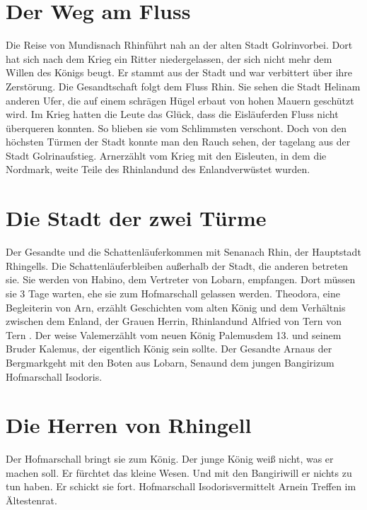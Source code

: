 \documentclass[12pt,a4paper,onecolumn,twoside,ngerman]{book}
\newcommand{\Tern}{Tern }
\newcommand{\Sena}{Sena}
\newcommand{\Bangiri}{Bangiri}
\newcommand{\Arwed}{Alfried von \Tern}
\newcommand{\Enland}{Enland}
\newcommand{\Schattenlaufer}{Schattenläufer}
\newcommand{\Lobarn}{Lobarn}
\newcommand{\Nordmark}{Nordmark}
\newcommand{\Bergmark}{Bergmark}
\newcommand{\Arn}{Arn}
\newcommand{\Eislaufer}{Eisläufer}
\newcommand{\Theodora}{Theodora}
\newcommand{\Rhinland}{Rhinland}
\newcommand{\Rhingell}{Rhingell}
\newcommand{\Mundis}{Mundis}
\newcommand{\Helin}{Helin}
\newcommand{\Golrin}{Golrin}
\newcommand{\Rhin}{Rhin}
\newcommand{\Habino}{Habino}
\newcommand{\Valem}{Valem}
\newcommand{\Palemus}{Palemus}
\newcommand{\Kalemus}{Kalemus}
\newcommand{\Isodoris}{Isodoris}
\begin{document}
\section{Der Weg am Fluss}
Die Reise von \Mundis nach \Rhin führt nah an der alten Stadt \Golrin vorbei. Dort hat sich nach dem Krieg ein Ritter niedergelassen, der sich nicht mehr dem Willen des Königs beugt. Er stammt aus der Stadt und war verbittert über ihre Zerstörung. Die Gesandtschaft folgt dem Fluss \Rhin . Sie sehen die Stadt \Helin am anderen Ufer, die auf einem schrägen Hügel erbaut von hohen Mauern geschützt wird. Im Krieg hatten die Leute das Glück, dass die \Eislaufer den Fluss nicht überqueren konnten. So blieben sie vom Schlimmsten verschont. Doch von den höchsten Türmen der Stadt konnte man den Rauch sehen, der tagelang aus der Stadt \Golrin aufstieg. \Arn erzählt vom Krieg mit den Eisleuten, in dem die \Nordmark , weite Teile des \Rhinland und des \Enland verwüstet wurden. 

\section{Die Stadt der zwei Türme}
Der Gesandte und die \Schattenlaufer kommen mit \Sena nach \Rhin, der Hauptstadt \Rhingell{s}. Die \Schattenlaufer bleiben außerhalb der Stadt, die anderen betreten sie. Sie werden von \Habino , dem Vertreter von \Lobarn , empfangen. Dort müssen sie 3 Tage warten, ehe sie zum Hofmarschall gelassen werden. \Theodora , eine Begleiterin von \Arn , erzählt Geschichten vom alten König und dem Verhältnis zwischen dem \Enland , der Grauen Herrin, \Rhinland und \Arwed von \Tern. Der weise \Valem erzählt vom neuen König \Palemus dem 13. und seinem Bruder \Kalemus , der eigentlich König sein sollte. Der Gesandte \Arn aus der \Bergmark geht mit den Boten aus \Lobarn , \Sena und dem jungen \Bangiri zum Hofmarschall \Isodoris.



\section{Die Herren von \Rhingell}
Der Hofmarschall bringt sie zum König. Der junge König weiß nicht, was er machen soll. Er fürchtet das kleine Wesen. Und mit den \Bangiri will er nichts zu tun haben. Er schickt sie fort. Hofmarschall \Isodoris vermittelt \Arn ein Treffen im Ältestenrat. 
\end{document}
